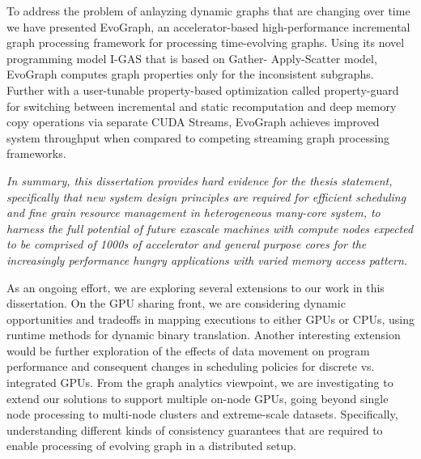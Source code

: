 To address the problem of anlayzing dynamic graphs that are changing over time we have presented EvoGraph, an accelerator-based high-performance incremental graph processing framework for processing time-evolving graphs. Using its novel programming model I-GAS that is based on Gather- Apply-Scatter model, EvoGraph computes graph properties only for the inconsistent subgraphs. Further with a user-tunable property-based optimization called property-guard for switching between incremental and static recomputation and deep memory copy operations via separate CUDA Streams, EvoGraph achieves improved system throughput when compared to competing streaming graph processing frameworks. 

\textit{In summary, this dissertation provides hard evidence for the thesis statement, specifically that new system design principles are required for efficient scheduling and fine grain resource management in heterogeneous many-core system, to harness the full potential of future exascale machines with compute nodes expected to be comprised of 1000s of accelerator and general purpose cores for the increasingly performance hungry applications with varied memory access pattern.}

As an ongoing effort, we are exploring several extensions to our work in this dissertation. On the GPU sharing front, we are considering dynamic opportunities and tradeoffs in mapping executions to either GPUs or CPUs, using runtime methods for dynamic binary translation. Another interesting extension would be further exploration of the effects of data movement on program performance and consequent changes in scheduling policies for discrete vs. integrated GPUs. From the graph analytics viewpoint, we are investigating to extend our solutions to support multiple on-node GPUs, going beyond single node processing to multi-node clusters and extreme-scale datasets. Specifically, understanding different kinds of consistency guarantees that are required to enable processing of evolving graph in a distributed setup.


